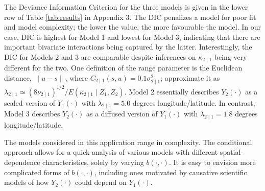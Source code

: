 \documentclass[lineno]{biometrika}
\newcommand{\svec} {s}
\newcommand{\uvec} {u}
\newcommand{\Yvec}{Y}
\newcommand{\Zvec}{Z}
\newcommand{\E}{E}
\begin{document}
The Deviance Information Criterion \citep[DIC,][]{Spiegelhalter_2002} for the three models is given in the lower row of Table \ref{tab:results} in Appendix 3. The DIC penalizes a model for poor fit and model complexity; the lower the value, the more favourable the model. In our case, DIC is highest for Model 1 and lowest for Model 3, indicating that there are important bivariate interactions being captured by the latter. Interestingly, the DIC for Models 2 and 3 are comparable despite inferences on $\kappa_{2\mid 1}$ being very different for the two. One definition of the range parameter is the Euclidean distance, $\|\uvec - \svec\|$, where $C_{2\mid 1}(\svec,\uvec) = 0.1\sigma^2_{2\mid 1}$; \citet{Lindgren_2011} approximate it as $\lambda_{2\mid 1} \simeq (8\nu_{2\mid 1})^{1/2}/\E(\kappa_{2\mid 1} \mid  \Zvec_1, \Zvec_2)$. Model 2 essentially describes $Y_2(\cdot)$ as a scaled version of $Y_1(\cdot)$ with $\lambda_{2\mid 1} = 5.0$ degrees longitude/latitude. In contrast, Model 3 describes $Y_2(\cdot)$ as a diffused version of $Y_1(\cdot)$ with $\lambda_{2\mid 1} = 1.8$ degrees longitude/latitude. 

The models considered in this application range in complexity. The conditional approach allows for a quick analysis of various models with different spatial-dependence characteristics, solely by varying $b(\cdot,\cdot)$. It is easy to envision more complicated forms of $b(\cdot,\cdot)$, including ones motivated by causative scientific models of how $Y_2(\cdot)$ could depend on $Y_1(\cdot)$. 



\end{document}
